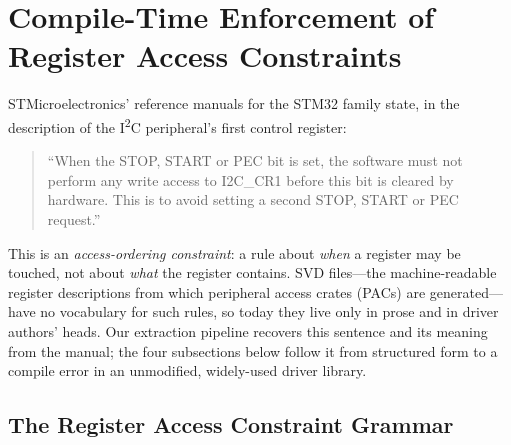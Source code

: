 %
%

\section{Compile-Time Enforcement of Register Access Constraints}
\label{sec:enforcement}

STMicroelectronics' reference manuals for the STM32 family state, in the
description of the I\textsuperscript{2}C peripheral's first control register:

\begin{quote}
``When the STOP, START or PEC bit is set, the software must not perform any
write access to I2C\_CR1 before this bit is cleared by hardware. This is to
avoid setting a second STOP, START or PEC request.''
\end{quote}

This is an \emph{access-ordering constraint}: a rule about \emph{when} a
register may be touched, not about \emph{what} the register contains. SVD
files---the machine-readable register descriptions from which peripheral
access crates (PACs) are generated---have no vocabulary for such rules, so
today they live only in prose and in driver authors' heads. Our extraction
pipeline recovers this sentence and its meaning from the manual; the four
subsections below follow it from structured form to a compile error in an
unmodified, widely-used driver library.

\subsection{The Register Access Constraint Grammar}
\label{sec:enforcement:grammar}

